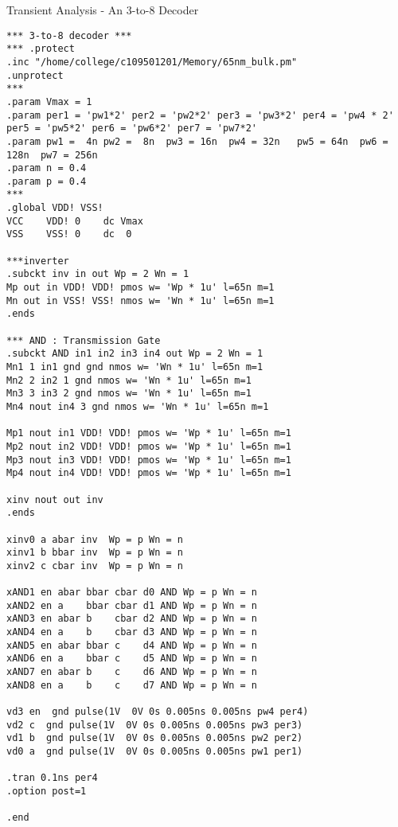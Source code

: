 \documentclass[a4paper]{article}
\newenvironment{code}{\captionsetup{type=listing, font=large, name=List.}}{}
\begin{document}
\begin{code}
    \caption{Transient Analysis - An 3-to-8 Decoder}
    \begin{verbatim}
*** 3-to-8 decoder ***
*** .protect
.inc "/home/college/c109501201/Memory/65nm_bulk.pm"
.unprotect
*** 
.param Vmax = 1
.param per1 = 'pw1*2' per2 = 'pw2*2' per3 = 'pw3*2' per4 = 'pw4 * 2' per5 = 'pw5*2' per6 = 'pw6*2' per7 = 'pw7*2'
.param pw1 =  4n pw2 =  8n  pw3 = 16n  pw4 = 32n   pw5 = 64n  pw6 = 128n  pw7 = 256n
.param n = 0.4
.param p = 0.4
***
.global VDD! VSS! 
VCC    VDD! 0    dc Vmax
VSS    VSS! 0    dc  0

***inverter
.subckt inv in out Wp = 2 Wn = 1
Mp out in VDD! VDD! pmos w= 'Wp * 1u' l=65n m=1
Mn out in VSS! VSS! nmos w= 'Wn * 1u' l=65n m=1
.ends

*** AND : Transmission Gate
.subckt AND in1 in2 in3 in4 out Wp = 2 Wn = 1
Mn1 1 in1 gnd gnd nmos w= 'Wn * 1u' l=65n m=1
Mn2 2 in2 1 gnd nmos w= 'Wn * 1u' l=65n m=1
Mn3 3 in3 2 gnd nmos w= 'Wn * 1u' l=65n m=1
Mn4 nout in4 3 gnd nmos w= 'Wn * 1u' l=65n m=1

Mp1 nout in1 VDD! VDD! pmos w= 'Wp * 1u' l=65n m=1
Mp2 nout in2 VDD! VDD! pmos w= 'Wp * 1u' l=65n m=1
Mp3 nout in3 VDD! VDD! pmos w= 'Wp * 1u' l=65n m=1
Mp4 nout in4 VDD! VDD! pmos w= 'Wp * 1u' l=65n m=1

xinv nout out inv
.ends

xinv0 a abar inv  Wp = p Wn = n
xinv1 b bbar inv  Wp = p Wn = n
xinv2 c cbar inv  Wp = p Wn = n

xAND1 en abar bbar cbar d0 AND Wp = p Wn = n
xAND2 en a    bbar cbar d1 AND Wp = p Wn = n
xAND3 en abar b    cbar d2 AND Wp = p Wn = n
xAND4 en a    b    cbar d3 AND Wp = p Wn = n
xAND5 en abar bbar c    d4 AND Wp = p Wn = n
xAND6 en a    bbar c    d5 AND Wp = p Wn = n
xAND7 en abar b    c    d6 AND Wp = p Wn = n
xAND8 en a    b    c    d7 AND Wp = p Wn = n

vd3 en  gnd pulse(1V  0V 0s 0.005ns 0.005ns pw4 per4)
vd2 c  gnd pulse(1V  0V 0s 0.005ns 0.005ns pw3 per3)
vd1 b  gnd pulse(1V  0V 0s 0.005ns 0.005ns pw2 per2)
vd0 a  gnd pulse(1V  0V 0s 0.005ns 0.005ns pw1 per1)

.tran 0.1ns per4
.option post=1

.end
\end{verbatim}
\end{code}
\end{document}
